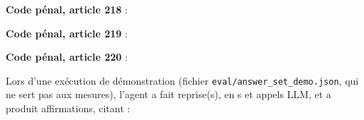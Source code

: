 \noindent\textbf{Code pénal, article 218} :

\noindent\textbf{Code pénal, article 219} :

\noindent\textbf{Code pénal, article 220} :


Lors d'une exécution de démonstration (fichier \texttt{eval/answer\_set\_demo.json}, qui ne sert pas aux mesures),
l'agent a fait \NExampleRetries{} reprise(s), en \NExampleSeconds{} s et \NExampleLlmcalls{} appels LLM, et a produit
\NExampleClaims{} affirmations, citant \NExampleCited :


